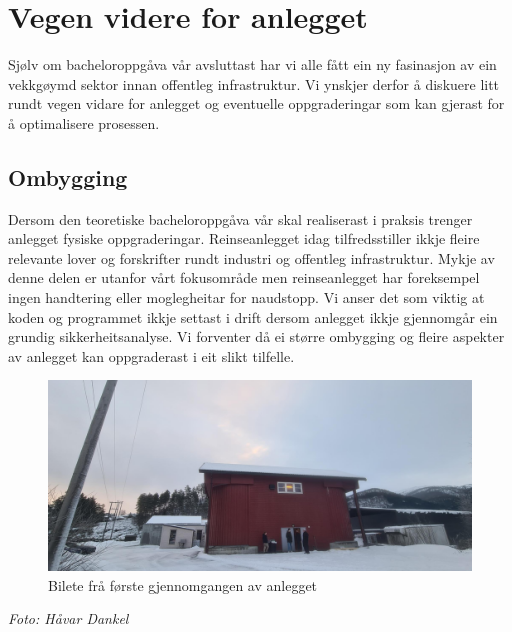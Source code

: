 \section{Vegen videre for anlegget}
\thispagestyle{fancy}

Sjølv om bacheloroppgåva vår avsluttast har vi alle fått ein ny fasinasjon av ein vekkgøymd sektor innan offentleg infrastruktur. 
Vi ynskjer derfor å diskuere litt rundt vegen vidare for anlegget og eventuelle oppgraderingar som kan gjerast
for å optimalisere prosessen.

\subsection{Ombygging}

Dersom den teoretiske bacheloroppgåva vår skal realiserast i praksis trenger anlegget fysiske oppgraderingar.
Reinseanlegget idag tilfredsstiller ikkje fleire relevante lover og forskrifter rundt industri og offentleg infrastruktur.
Mykje av denne delen er utanfor vårt fokusområde men reinseanlegget har foreksempel ingen handtering eller moglegheitar for naudstopp.
Vi anser det som viktig at koden og programmet ikkje settast i drift dersom anlegget ikkje gjennomgår ein grundig sikkerheitsanalyse.
Vi forventer då ei større ombygging og fleire aspekter av anlegget kan oppgraderast i eit slikt tilfelle. \newline \newline

\begin{figure}[htbp]
    \centering
    \includegraphics[width=1\textwidth]{Bilder/SandeGjennomgang.jpg}
    \caption{Bilete frå første gjennomgangen av anlegget}\label{fig:Bilete Gjennomgang}
\end{figure}

\begin{center}
    \textit{Foto: Håvar Dankel}
\end{center}

